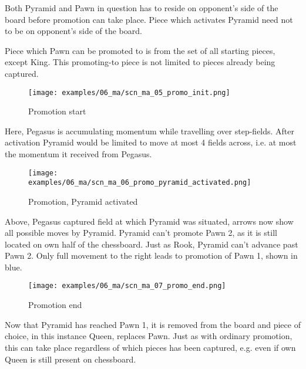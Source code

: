 Both Pyramid and Pawn in question has to reside on opponent's side of the
board before promotion can take place. Piece which activates Pyramid need
not to be on opponent's side of the board.

Piece which Pawn can be promoted to is from the set of all starting pieces,
except King. This promoting-to piece is not limited to pieces already being
captured.

\clearpage %

\noindent
\begin{figure}[!h]
\texttt{[image: examples/06\_ma/scn\_ma\_05\_promo\_init.png]}
\caption{Promotion start}
\label{fig:scn_ma_05_promo_init}
\end{figure}

Here, Pegasus is accumulating momentum while travelling over step-fields. After
activation Pyramid would be limited to move at most 4 fields across, i.e. at most
the momentum it received from Pegasus.

\clearpage %

\noindent
\begin{figure}[!h]
\texttt{[image: examples/06\_ma/scn\_ma\_06\_promo\_pyramid\_activated.png]}
\caption{Promotion, Pyramid activated}
\label{fig:scn_ma_06_promo_pyramid_activated}
\end{figure}

Above, Pegasus captured field at which Pyramid was situated, arrows now show
all possible moves by Pyramid. Pyramid can't promote Pawn 2, as it is still
located on own half of the chessboard. Just as Rook, Pyramid can't advance
past Pawn 2. Only full movement to the right leads to promotion of Pawn 1,
shown in blue.

\clearpage %

\noindent
\begin{figure}[!h]
\texttt{[image: examples/06\_ma/scn\_ma\_07\_promo\_end.png]}
\caption{Promotion end}
\label{fig:scn_ma_07_promo_end}
\end{figure}

Now that Pyramid has reached Pawn 1, it is removed from the board and piece of
choice, in this instance Queen, replaces Pawn. Just as with ordinary promotion,
this can take place regardless of which pieces has been captured, e.g. even if
own Queen is still present on chessboard.

